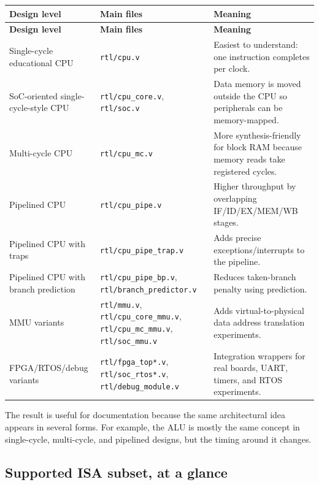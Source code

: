 \begin{longtable}{|>{\RaggedRight\arraybackslash}p{}|>{\RaggedRight\arraybackslash}p{}|>{\RaggedRight\arraybackslash}p{}|}
\hline
\textbf{Design level} & \textbf{Main files} & \textbf{Meaning} \\
\hline
\endfirsthead
\hline
\textbf{Design level} & \textbf{Main files} & \textbf{Meaning} \\
\hline
\endhead
Single-cycle educational CPU & \texttt{rtl/cpu.v} & Easiest to understand: one instruction completes per clock. \\
\hline
SoC-oriented single-cycle-style CPU & \texttt{rtl/cpu\_core.v}, \texttt{rtl/soc.v} & Data memory is moved outside the CPU so peripherals can be memory-mapped. \\
\hline
Multi-cycle CPU & \texttt{rtl/cpu\_mc.v} & More synthesis-friendly for block RAM because memory reads take registered cycles. \\
\hline
Pipelined CPU & \texttt{rtl/cpu\_pipe.v} & Higher throughput by overlapping IF/ID/EX/MEM/WB stages. \\
\hline
Pipelined CPU with traps & \texttt{rtl/cpu\_pipe\_trap.v} & Adds precise exceptions/interrupts to the pipeline. \\
\hline
Pipelined CPU with branch prediction & \texttt{rtl/cpu\_pipe\_bp.v}, \texttt{rtl/branch\_predictor.v} & Reduces taken-branch penalty using prediction. \\
\hline
MMU variants & \texttt{rtl/mmu.v}, \texttt{rtl/cpu\_core\_mmu.v}, \texttt{rtl/cpu\_mc\_mmu.v}, \texttt{rtl/soc\_mmu.v} & Adds virtual-to-physical data address translation experiments. \\
\hline
FPGA/RTOS/debug variants & \texttt{rtl/fpga\_top*.v}, \texttt{rtl/soc\_rtos*.v}, \texttt{rtl/debug\_module.v} & Integration wrappers for real boards, UART, timers, and RTOS experiments. \\
\hline
\end{longtable}

The result is useful for documentation because the same architectural idea appears in several forms. For example, the ALU is mostly the same concept in single-cycle, multi-cycle, and pipelined designs, but the timing around it changes.

\subsection{Supported ISA subset, at a glance}

